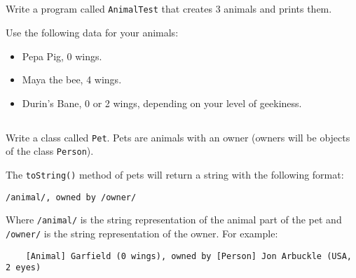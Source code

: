 \documentclass[a4paper, 11pt]{article}
\begin{document}
\subsection{}

Write a program called \verb+AnimalTest+ that creates 3 animals and prints
them.

Use the following data for your animals:

\begin{itemize}

  \item Pepa Pig, 0 wings.

  \item Maya the bee, 4 wings.

  \item Durin's Bane, 0 or 2 wings, depending on your level of geekiness.

\end{itemize}












\subsection{}

Write a class called \verb+Pet+. Pets are animals with an owner (owners will be
objects of the class \verb+Person+).

The \verb+toString()+ method of pets will return a string with the following
format:

\verb+/animal/, owned by /owner/+

Where \verb+/animal/+ is the string representation of the animal part of the
pet and \verb+/owner/+ is the string representation of the owner. For example:

\verb+    [Animal] Garfield (0 wings), owned by [Person] Jon Arbuckle (USA, 2 eyes)+


\subsection{}
\end{document}
